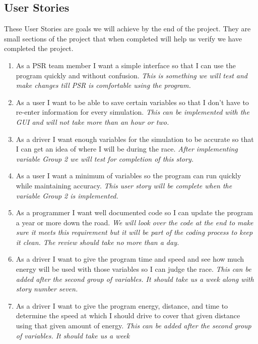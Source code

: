 \documentclass[onecolumn, draftclsnofoot,10pt, compsoc]{IEEEtran}
\begin{document}
    \subsection{User Stories}
    These User Stories are goals we will achieve by the end of the project. They are small sections of the project that when completed will help us verify we have completed the project.
    \begin{enumerate}
        \item As a PSR team member I want a simple interface so that I can use the program quickly and without confusion. \textit{This is something we will test and make changes till PSR is comfortable using the program.}
        \item As a user I want to be able to save certain variables so that I don't have to re-enter information for every simulation. \textit{This can be implemented with the GUI and will not take more than an hour or two.}
        \item As a driver I want enough variables for the simulation to be accurate so that I can get an idea of where I will be during the race. \textit{After implementing variable Group 2 we will test for completion of this story.}
        \item As a user I want a minimum of variables so the program can run quickly while maintaining accuracy. \textit{This user story will be complete when the variable Group 2 is implemented.}
        \item As a programmer I want well documented code so I can update the program a year or more down the road. \textit{We will look over the code at the end to make sure it meets this requirement but it will be part of the coding process to keep it clean. The review should take no more than a day.}
        \item As a driver I want to give the program time and speed and see how much energy will be used with those variables so I can judge the race. \textit{This can be added after the second group of variables. It should take us a week along with story number seven.}
        \item As a driver I want to give the program energy, distance, and time to determine the speed at which I should drive to cover that given distance using that given amount of energy. \textit{This can be added after the second group of variables. It should take us a week}
    \end{enumerate}
    
\end{document}
